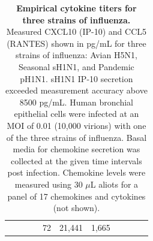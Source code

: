 \documentclass[10pt]{article}
\begin{document}
\begin{table}[!ht]
\begin{center}
\begin{tabular}{| r r r | c | r r r | c | r r r |}
  & & & & 72 & 21,441 & 1,665 &  &  &  &  \\
    \cline{1-3} \cline{5-7} \cline{9-11}
\end{tabular}
\caption{\textbf{Empirical cytokine titers for three strains of influenza.}  Measured CXCL10 (IP-10) and CCL5 (RANTES) shown in pg/mL for three strains of influenza: Avian H5N1, Seasonal sH1N1, and Pandemic pH1N1.  sH1N1 IP-10 secretion exceeded measurement accuracy above 8500 pg/mL.  Human bronchial epithelial cells were infected at an MOI of 0.01 (10,000 virions) with one of the three strains of influenza.  Basal media for chemokine secretion was collected at the given time intervals post infection.  Chemokine levels were measured using 30 $\mu$L aliots for a panel of 17 chemokines and cytokines (not shown).}
\label{tab:data}
\end{center}
\end{table}
\end{document}
